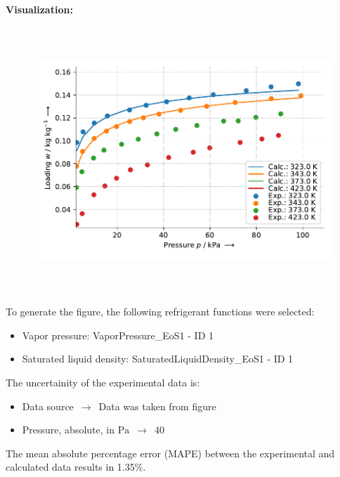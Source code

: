 \textbf{Visualization:}
%
\begin{figure}[!htp]
{\noindent\includegraphics[height=10cm, keepaspectratio]{figs/ads/ads_Propylene_zeolite_crystal_5A_DubininAstakhov_1.pdf}}
\end{figure}
%

To generate the figure, the following refrigerant functions were selected:
\begin{itemize}
\item Vapor pressure: VaporPressure\_EoS1 - ID 1
\item Saturated liquid density: SaturatedLiquidDensity\_EoS1 - ID 1
\end{itemize}

The uncertainity of the experimental data is:
\begin{itemize}
\item Data source $\,\to\,$ Data was taken from figure
\item Pressure, absolute, in $\si{\pascal}$ $\,\to\,$ 40
\end{itemize}

The mean absolute percentage error (MAPE) between the experimental and calculated data results in 1.35\%.
\FloatBarrier
\newpage
